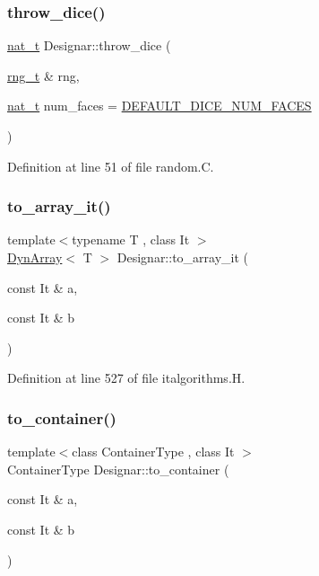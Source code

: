 \subsubsection{\texorpdfstring{throw\+\_\+dice()}{throw\_dice()}}
{\footnotesize\ttfamily \hyperlink{namespace_designar_aa72662848b9f4815e7bf31a7cf3e33d1}{nat\+\_\+t} Designar\+::throw\+\_\+dice (\begin{DoxyParamCaption}\item[{\hyperlink{namespace_designar_a9ca84e2ff5daa62ebc4dab52f3a6c855}{rng\+\_\+t} \&}]{rng,  }\item[{\hyperlink{namespace_designar_aa72662848b9f4815e7bf31a7cf3e33d1}{nat\+\_\+t}}]{num\+\_\+faces = {\ttfamily \hyperlink{namespace_designar_af614c8a444ce943532075892ad401662}{D\+E\+F\+A\+U\+L\+T\+\_\+\+D\+I\+C\+E\+\_\+\+N\+U\+M\+\_\+\+F\+A\+C\+ES}} }\end{DoxyParamCaption})}



Definition at line 51 of file random.\+C.

\mbox{\label{namespace_designar_a65634dc64216572c3a7bba9a2c47dbf4}} 
\subsubsection{\texorpdfstring{to\+\_\+array\+\_\+it()}{to\_array\_it()}}
{\footnotesize\ttfamily template$<$typename T , class It $>$ \\
\hyperlink{class_designar_1_1_dyn_array}{Dyn\+Array}$<$ T $>$ Designar\+::to\+\_\+array\+\_\+it (\begin{DoxyParamCaption}\item[{const It \&}]{a,  }\item[{const It \&}]{b }\end{DoxyParamCaption})}



Definition at line 527 of file italgorithms.\+H.

\mbox{\label{namespace_designar_a6a10446f00b4d600010819b75113190b}} 
\subsubsection{\texorpdfstring{to\+\_\+container()}{to\_container()}}
{\footnotesize\ttfamily template$<$class Container\+Type , class It $>$ \\
Container\+Type Designar\+::to\+\_\+container (\begin{DoxyParamCaption}\item[{const It \&}]{a,  }\item[{const It \&}]{b }\end{DoxyParamCaption})}




